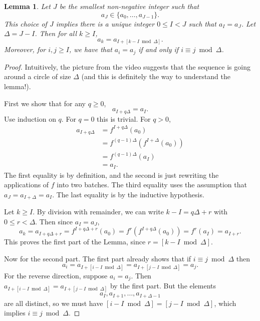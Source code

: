 \documentclass[11pt]{article}
\newtheorem{lemma}{Lemma}
\begin{document}
\begin{lemma}\label{lem:period}
    Let $J$ be the smallest non-negative integer such that 
    \[
        a_J \in \{a_0,\ldots,a_{J-1}\}.
    \]
    This choice of $J$ implies there is a unique integer $0 \leq I < J$ such
    that $a_I = a_J$.  Let $\Delta = J-I$.  Then for all $k\geq I$,
    \[
        a_k = a_{I+[k-I \bmod \Delta]}.
    \]
    Moreover, for $i,j\geq I$,
    we have that $a_i = a_j$ if and only if $i \equiv j \bmod \Delta$.
\end{lemma}
\begin{proof}
    Intuitively, the picture from the video suggests
    that the sequence is going around a circle of size $\Delta$ (and this
    is definitely the way to understand the lemma!).  

    First we show that for any $q\geq 0$, 
    \[
        a_{I+q\Delta} = a_I.
    \]
    Use induction on $q$. For $q=0$ this is trivial. For $q>0$,
    \begin{align*}
        a_{I+q\Delta}  
        & = f^{I+q\Delta}(a_0) \\
        & = f^{(q-1)\Delta}(f^{I+\Delta}(a_0))\\
        & = f^{(q-1)\Delta}(a_I)\\
        & = a_I.
    \end{align*}
    The first equality is by definition, and the second is just rewriting
    the applications of $f$ into two batches. The third equality uses
    the assumption that $a_J = a_{I+\Delta} = a_I$. The last equality
    is by the inductive hypothesis.

    Let $k\geq I$. By division with remainder, we can write
    $k-I = q\Delta + r$ with $0\leq r < \Delta$.
    Then since $a_I = a_J$,
    \[
        a_k 
        = a_{I + q\Delta + r}
        = f^{I + q\Delta + r}(a_0)
        = f^{r}(f^{I+q\Delta}(a_0))
        = f^{r}(a_I)
        = a_{I+r}.
    \]
    This proves the first part of the Lemma, since $r = [k-I\bmod \Delta]$.

    Now for the second part. The first part already shows that if
    $i\equiv j \bmod \Delta$ then 
    \[
        a_i 
        = a_{I+[i-I\bmod \Delta]}
        =a_{I+[j-I\bmod \Delta]}
        = a_j.
    \]
    For the reverse direction, suppose $a_i = a_j$. Then $a_{I+[i-I\bmod
    \Delta]} = a_{I+[j-I\bmod \Delta]}$ by the first part. But the elements
    \[
        a_I,a_{I+1},\ldots,a_{I+\Delta-1}
    \]
    are all distinct, so we must have $[i-I\bmod\Delta] = [j-I\bmod\Delta]$,
    which implies $i\equiv j \bmod \Delta$.
\end{proof}
\end{document}
